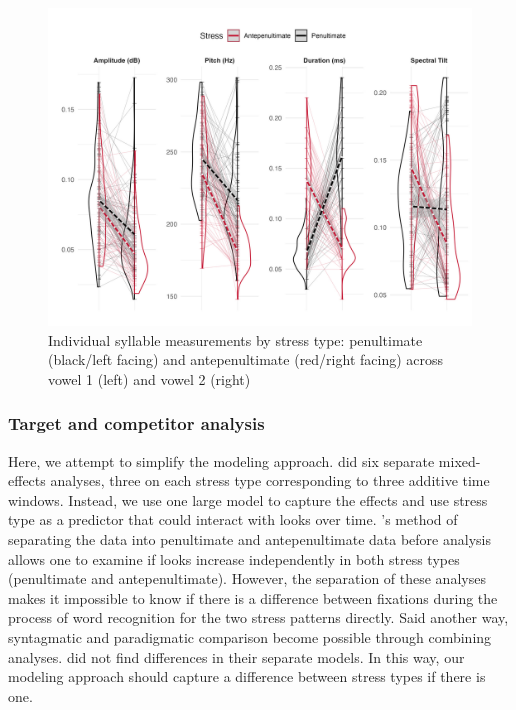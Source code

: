 \begin{figure}[H]
  \centering
  \includegraphics[width=1\linewidth]{visuals/raw_acoustics.jpeg} %
  \caption{Individual syllable measurements by stress type: penultimate (black/left facing) and antepenultimate (red/right facing)  across vowel 1 (left) and vowel 2 (right)}
  \label{fig:raw_acoustics}
\end{figure}


\subsubsection{Target and competitor analysis}
Here, we attempt to simplify the modeling approach. \cite{Sulpizio_McQueen_2012} did six separate mixed-effects analyses, three on each stress type corresponding to three additive time windows. Instead, we use one large model to capture the effects and use stress type as a predictor that could interact with looks over time. \cite{Sulpizio_McQueen_2012}'s method of separating the data into penultimate and antepenultimate data before analysis allows one to examine if looks increase independently in both stress types (penultimate and antepenultimate). However, the separation of these analyses makes it impossible to know if there is a difference between fixations during the process of word recognition for the two stress patterns directly. Said another way, syntagmatic and paradigmatic comparison become possible through combining analyses. \cite{Sulpizio_McQueen_2012} did not find differences in their separate models. In this way, our modeling approach should capture a difference between stress types if there is one. 

